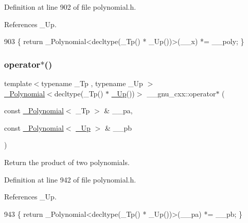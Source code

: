 Definition at line 902 of file polynomial.\+h.



References \+\_\+\+Up.


\begin{DoxyCode}
903     \{ \textcolor{keywordflow}{return} \_Polynomial<decltype(\_Tp() * \_Up())>(\_\_x) *= \_\_poly; \}
\end{DoxyCode}
\mbox{\label{namespace____gnu__cxx_a2f76fd6f7c2c9e64fba1d5892844f26b}} 
\subsubsection{\texorpdfstring{operator$\ast$()}{operator*()}\hspace{0.1cm}{\footnotesize\ttfamily [6/6]}}
{\footnotesize\ttfamily template$<$typename \+\_\+\+Tp , typename \+\_\+\+Up $>$ \\
\hyperlink{class____gnu__cxx_1_1__Polynomial}{\+\_\+\+Polynomial}$<$decltype(\+\_\+\+Tp() $\ast$ \hyperlink{namespace____gnu__cxx_ab693ea357b6429b331e0bf09f9442385}{\+\_\+\+Up}())$>$ \+\_\+\+\_\+gnu\+\_\+cxx\+::operator$\ast$ (\begin{DoxyParamCaption}\item[{const \hyperlink{class____gnu__cxx_1_1__Polynomial}{\+\_\+\+Polynomial}$<$ \+\_\+\+Tp $>$ \&}]{\+\_\+\+\_\+pa,  }\item[{const \hyperlink{class____gnu__cxx_1_1__Polynomial}{\+\_\+\+Polynomial}$<$ \hyperlink{namespace____gnu__cxx_ab693ea357b6429b331e0bf09f9442385}{\+\_\+\+Up} $>$ \&}]{\+\_\+\+\_\+pb }\end{DoxyParamCaption})\hspace{0.3cm}{\ttfamily [inline]}}

Return the product of two polynomials. 

Definition at line 942 of file polynomial.\+h.



References \+\_\+\+Up.


\begin{DoxyCode}
943     \{ \textcolor{keywordflow}{return} \_Polynomial<decltype(\_Tp() * \_Up())>(\_\_pa) *= \_\_pb; \}
\end{DoxyCode}
\mbox{\label{namespace____gnu__cxx_a6864af2e99c7797a84209d8dffcf11e5}} 
